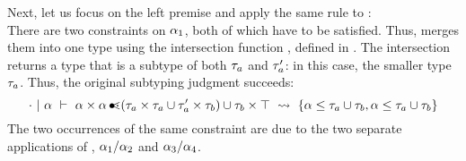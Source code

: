 Next, let us focus on the left premise and apply the same rule to \va:\\
There are two constraints on $\alpha_1$, both of which have to be satisfied.
Thus,  merges them into one type using the intersection
function , defined in .
The intersection returns a type that is a subtype of both $\tau_a$ and $\tau'_a$:
in this case, the smaller type $\tau_a$.
Thus, the original subtyping judgment succeeds:
\[
    \cdot~\vert~\alpha\ \vdash\ \alpha \times \alpha \operatorname{\bullet\!\!\lessdot} (\tau_a \times \tau_a \cup \tau'_a \times \tau_b) \cup \tau_b \times \top\ \rightsquigarrow\  \{\alpha \leq \tau_a \cup \tau_b, \alpha \leq \tau_a \cup \tau_b\} 
\]
The two occurrences of the same constraint are due to the two separate
applications of , $\alpha_1/\alpha_2$ and $\alpha_3/\alpha_4$.

